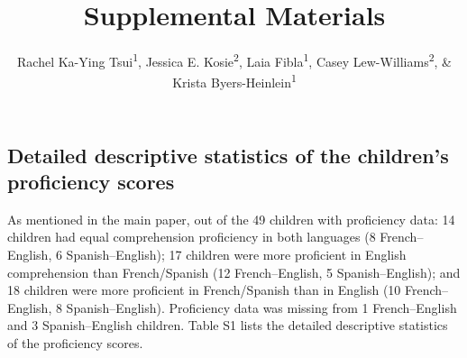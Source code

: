 \documentclass[
  man,floatsintext]{apa7}
\title{Supplemental Materials}
\author{Rachel Ka-Ying Tsui\textsuperscript{1}, Jessica E. Kosie\textsuperscript{2}, Laia Fibla\textsuperscript{1}, Casey Lew-Williams\textsuperscript{2}, \& Krista Byers-Heinlein\textsuperscript{1}}
\date{}
\affiliation{\vspace{0.5cm}\textsuperscript{1} Concordia University\\\textsuperscript{2} Princeton University}
\begin{document}
\maketitle

\captionsetup[table]{labelformat=empty}

\hypertarget{detailed-descriptive-statistics-of-the-childrens-proficiency-scores}{%
\subsection{Detailed descriptive statistics of the children's proficiency scores}\label{detailed-descriptive-statistics-of-the-childrens-proficiency-scores}}

As mentioned in the main paper, out of the 49 children with proficiency data: 14 children had equal comprehension proficiency in both languages (8 French--English, 6 Spanish--English); 17 children were more proficient in English comprehension than French/Spanish (12 French--English, 5 Spanish--English); and 18 children were more proficient in French/Spanish than in English (10 French--English, 8 Spanish--English). Proficiency data was missing from 1 French--English and 3 Spanish--English children. Table S1 lists the detailed descriptive statistics of the proficiency scores.
\end{document}
